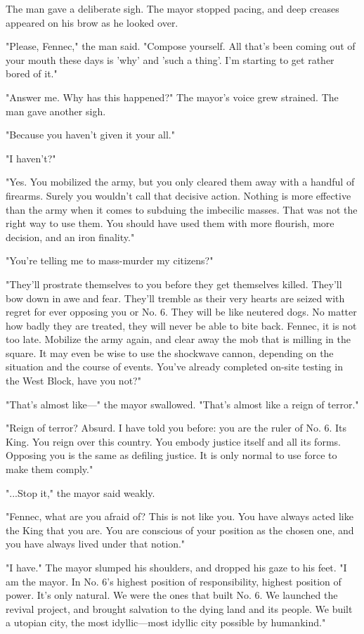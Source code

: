 The man gave a deliberate sigh. The mayor stopped pacing, and deep
creases appeared on his brow as he looked over.

"Please, Fennec," the man said. "Compose yourself. All that's been
coming out of your mouth these days is 'why' and 'such a thing'. I'm
starting to get rather bored of it."

"Answer me. Why has this happened?" The mayor's voice grew strained. The
man gave another sigh.

"Because you haven't given it your all."

"I haven't?"

"Yes. You mobilized the army, but you only cleared them away with a
handful of firearms. Surely you wouldn't call that decisive action.
Nothing is more effective than the army when it comes to subduing the
imbecilic masses. That was not the right way to use them. You should
have used them with more flourish, more decision, and an iron finality."

"You're telling me to mass-murder my citizens?"

"They'll prostrate themselves to you before they get themselves killed.
They'll bow down in awe and fear. They'll tremble as their very hearts
are seized with regret for ever opposing you or No. 6. They will be like
neutered dogs. No matter how badly they are treated, they will never be
able to bite back. Fennec, it is not too late. Mobilize the army again,
and clear away the mob that is milling in the square. It may even be
wise to use the shockwave cannon, depending on the situation and the
course of events. You've already completed on-site testing in the West
Block, have you not?"

"That's almost like---" the mayor swallowed. "That's almost like a reign
of terror."

"Reign of terror? Absurd. I have told you before: you are the ruler of
No. 6. Its King. You reign over this country. You embody justice itself
and all its forms. Opposing you is the same as defiling justice. It is
only normal to use force to make them comply."

"...Stop it," the mayor said weakly.

"Fennec, what are you afraid of? This is not like you. You have always
acted like the King that you are. You are conscious of your position as
the chosen one, and you have always lived under that notion."

"I have." The mayor slumped his shoulders, and dropped his gaze to his
feet. "I am the mayor. In No. 6's highest position of responsibility,
highest position of power. It's only natural. We were the ones that
built No. 6. We launched the revival project, and brought salvation to
the dying land and its people. We built a utopian city, the most
idyllic---most idyllic city possible by humankind."

